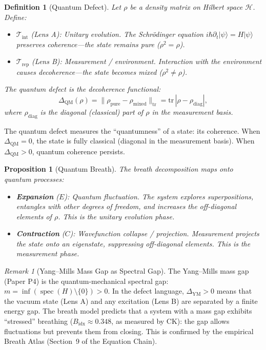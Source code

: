 \documentclass[12pt, openany]{book}
\newtheorem{proposition}[theorem]{Proposition}
\newtheorem{definition}[theorem]{Definition}
\theoremstyle{remark}
\newtheorem{remark}[theorem]{Remark}
\newcommand{\Tint}{\mathcal{T}_{\mathrm{int}}}
\newcommand{\Trep}{\mathcal{T}_{\mathrm{rep}}}
\newcommand{\Hilb}{\mathcal{H}}
\DeclareMathOperator{\spec}{spec}
\begin{document}
\begin{definition}[Quantum Defect]
\label{def:quantum-defect}
Let $\rho$ be a density matrix on Hilbert space $\Hilb$.  Define:
\begin{itemize}
  \item $\Tint$ (Lens A): Unitary evolution.  The Schr\"odinger equation
        $i\hbar \partial_t |\psi\rangle = H|\psi\rangle$ preserves coherence---the
        state remains pure ($\rho^2 = \rho$).
  \item $\Trep$ (Lens B): Measurement / environment.  Interaction with the
        environment causes decoherence---the state becomes mixed ($\rho^2 \neq \rho$).
\end{itemize}
The quantum defect is the decoherence functional:
\[
  \Delta_{\mathrm{QM}}(\rho) = \|\rho_{\mathrm{pure}} - \rho_{\mathrm{mixed}}\|_{\mathrm{tr}}
  = \mathrm{tr}\,|\rho - \rho_{\mathrm{diag}}|,
\]
where $\rho_{\mathrm{diag}}$ is the diagonal (classical) part of $\rho$ in the
measurement basis.
\end{definition}

\noindent
The quantum defect measures the ``quantumness'' of a state: its coherence.
When $\Delta_{\mathrm{QM}} = 0$, the state is fully classical (diagonal in the
measurement basis).  When $\Delta_{\mathrm{QM}} > 0$, quantum coherence persists.

\begin{proposition}[Quantum Breath]
\label{prop:quantum-breath}
The breath decomposition maps onto quantum processes:
\begin{itemize}
  \item \textbf{Expansion} ($E$): Quantum fluctuation.  The system explores
        superpositions, entangles with other degrees of freedom, and increases
        the off-diagonal elements of $\rho$.  This is the unitary evolution
        phase.
  \item \textbf{Contraction} ($C$): Wavefunction collapse / projection.
        Measurement projects the state onto an eigenstate, suppressing
        off-diagonal elements.  This is the measurement phase.
\end{itemize}
\end{proposition}

\begin{remark}[Yang--Mills Mass Gap as Spectral Gap]
The Yang--Mills mass gap (Paper P4) is the quantum-mechanical spectral gap:
$m = \inf(\spec(H) \setminus \{0\}) > 0$.  In the defect language,
$\Delta_{\mathrm{YM}} > 0$ means that the vacuum state (Lens A) and any
excitation (Lens B) are separated by a finite energy gap.  The
breath model predicts that a system with a mass gap exhibits ``stressed''
breathing ($B_{\mathrm{idx}} \approx 0.348$, as measured by CK): the
gap allows fluctuations but prevents them from closing.  This is
confirmed by the empirical Breath Atlas (Section~9 of the Equation Chain).
\end{remark}
\end{document}

